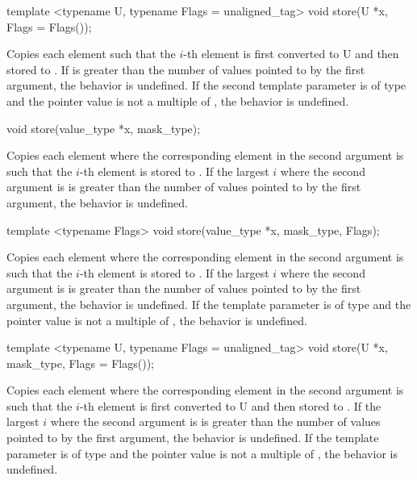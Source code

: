 \begin{wgText}
  \begin{itemdecl}
template <typename U, typename Flags = unaligned_tag> void store(U *x, Flags = Flags());
  \end{itemdecl}
  \begin{itemdescr}
    \pnum\effects Copies each element such that the $i$-th element is first converted to \type U and then stored to .
    \pnum\remarks If \datapar{} is greater than the number of values pointed to by the first argument, the behavior is undefined.
    \pnum         If the second template parameter is of type  and the pointer value is not a multiple of , the behavior is undefined.
  \end{itemdescr}

  \begin{itemdecl}
void store(value_type *x, mask_type);
  \end{itemdecl}
  \begin{itemdescr}
    \pnum\effects Copies each element where the corresponding element in the second argument is \true such that the $i$-th element is stored to .
    \pnum\remarks If the largest $i$ where the second argument is \true is greater than the number of values pointed to by the first argument, the behavior is undefined.
  \end{itemdescr}

  \begin{itemdecl}
template <typename Flags> void store(value_type *x, mask_type, Flags);
  \end{itemdecl}
  \begin{itemdescr}
    \pnum\effects Copies each element where the corresponding element in the second argument is \true such that the $i$-th element is stored to .
    \pnum\remarks If the largest $i$ where the second argument is \true is greater than the number of values pointed to by the first argument, the behavior is undefined.
    \pnum         If the template parameter is of type  and the pointer value is not a multiple of , the behavior is undefined.
  \end{itemdescr}

  \begin{itemdecl}
template <typename U, typename Flags = unaligned_tag> void store(U *x, mask_type, Flags = Flags());
  \end{itemdecl}
  \begin{itemdescr}
    \pnum\effects Copies each element where the corresponding element in the second argument is \true such that the $i$-th element is first converted to \type U and then stored to .
    \pnum\remarks If the largest $i$ where the second argument is \true is greater than the number of values pointed to by the first argument, the behavior is undefined.
    \pnum         If the template parameter is of type  and the pointer value is not a multiple of , the behavior is undefined.
  \end{itemdescr}


\end{wgText}
